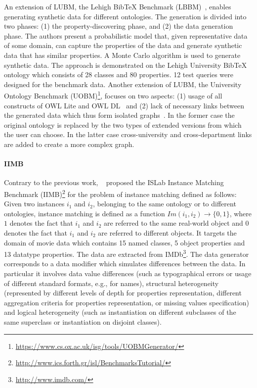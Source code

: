 An extension of LUBM, the Lehigh BibTeX Benchmark (LBBM)~\cite{Wang2005}, enables generating synthetic data for different ontologies. The generation is divided into two phases: (1) the property-discovering phase, and (2) the data generation phase. The authors present a probabilistic model that, given representative data of some domain, can capture the properties of the data and generate synthetic data that has similar properties. A Monte Carlo algorithm is used to generate synthetic data. The approach is demonstrated on the Lehigh University BibTeX ontology which consists of 28 classes and 80 properties. 12 test queries were designed for  the benchmark data. Another extension of LUBM, the University Ontology Benchmark (UOBM)\footnote{\url{https://www.cs.ox.ac.uk/isg/tools/UOBMGenerator/}}, focuses on two aspects: (1) usage of all constructs of OWL Lite and OWL DL~\cite{owl} and (2) lack of necessary links between the generated data which thus form isolated graphs~\cite{Ma:2006:TCO:2094613.2094629}. In the former case the original ontology is replaced by the two types of extended versions from which the user can choose. In the latter case cross-university and cross-department links are added to create a more complex graph.

\paragraph{IIMB} Contrary to the previous work, ~\cite{Ferrara08OM} proposed the ISLab Instance Matching Benchmark (IIMB)\footnote{\url{http://www.ics.forth.gr/isl/BenchmarksTutorial/}} for the problem of instance matching defined as follows: Given two instances $i_1$ and $i_2$, belonging to the same ontology or to different ontologies, instance matching is defined as a function $Im(i_1, i_2) \rightarrow \{0, 1\}$,  where $1$ denotes the fact that $i_1$ and $i_2$ are referred to the same real-world object and $0$ denotes the fact that $i_1$ and $i_2$ are referred to different objects. It targets the domain of movie data which contains 15 named classes, 5 object properties and 13 datatype properties. The data are extracted from IMDb\footnote{\url{http://www.imdb.com/}}. The data generator corresponds to a data modifier which simulates differences between the data. In particular it involves data value differences (such as typographical errors or usage of different standard formats, e.g., for names), structural heterogeneity (represented by different levels of depth for properties representation, different aggregation criteria for properties representation, or missing values specification) and logical heterogeneity (such as instantiation on different subclasses of the same superclass or instantiation on disjoint classes).


